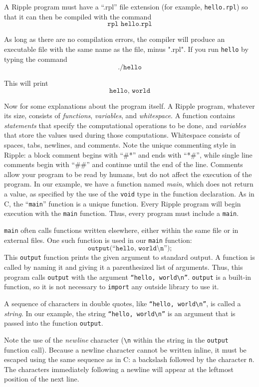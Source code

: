 \documentclass{article}
\newcommand{\code}{\texttt}
\newcommand{\back}{\textbackslash}
\begin{document}
A Ripple program must have a  ``.rpl'' file extension (for example, \code{hello.rpl}) so that it can then be compiled with the command
\[ \code{rpl hello.rpl} \]

As long as there are no compilation errors, the compiler will produce an executable file with the same name as the file, minus ".rpl". If you run \code{hello} by typing the command
\[ \code{./hello} \]

This will print
\[ \code{hello, world} \]

Now for some explanations about the program itself. A Ripple program, whatever its size, consists of \emph{functions}, \emph{variables}, and \emph{whitespace}. A function contains \emph{statements} that specify the computational operations to be done, and \emph{variables} that store the values used during those computations. Whitespace consists of spaces, tabs, newlines, and comments. Note the unique commenting style in Ripple: a block comment begins with ``\#*'' and ends with ``*\#'', while single line comments begin with ``\#\#'' and continue until the end of the line. Comments allow your program to be read by humans, but do not affect the execution of the program. In our example, we have a function named \emph{main}, which does not return a value, as specified by the use of the \code{void} type in the function declaration. As in C, the ``\code{main}'' function is a unique function. Every Ripple program will begin execution with the \code{main} function. Thus, every program must include a \code{main}.

\code{main} often calls functions written elsewhere, either within the same file or in external files. One such function is used in our \code{main} function:
\[ \code{output(``hello, world\textbackslash n'');} \]
This \code{output} function prints the given argument to standard output. A function is called by naming it and giving it a parenthesized list of arguments. Thus, this program calls \code{output} with the argument \code{``hello, world\back n''}. \code{output} is a built-in function, so it is not necessary to \code{import} any outside library to use it.

A sequence of characters in double quotes, like \code{``hello, world\back n''}, is called a \emph{string}. In our example, the string \code{``hello, world\back n''} is an argument that is passed into the function \code{output}.

Note the use of the \emph{newline} character (\code{\back n} within the string in the \code{output} function call). Because a newline character cannot be written inline, it must be escaped using the same sequence as in C: a backslash followed by the character \code{n}. The characters immediately following a newline will appear at the leftmost position of the next line.
\end{document}
